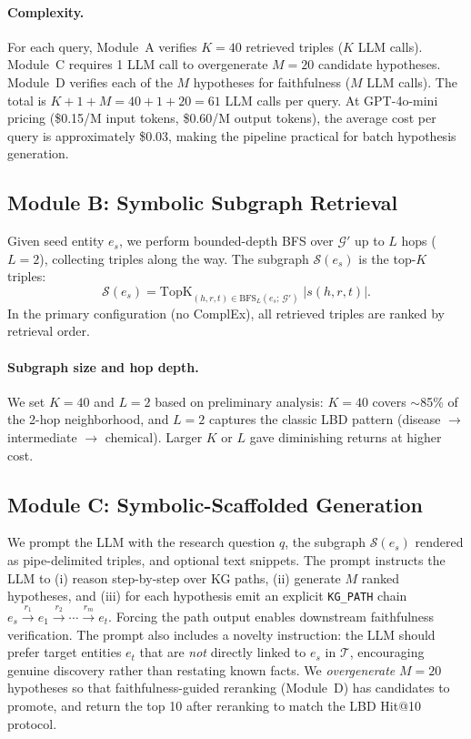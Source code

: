 \paragraph{Complexity.}
For each query, Module~A verifies $K{=}40$ retrieved triples ($K$ LLM calls). Module~C requires 1 LLM call to overgenerate $M{=}20$ candidate hypotheses. Module~D verifies each of the $M$ hypotheses for faithfulness ($M$ LLM calls). The total is $K{+}1{+}M = 40{+}1{+}20 = 61$ LLM calls per query. At GPT-4o-mini pricing (\$0.15/M input tokens, \$0.60/M output tokens), the average cost per query is approximately \$0.03, making the pipeline practical for batch hypothesis generation.

\subsection{Module B: Symbolic Subgraph Retrieval}
\label{sec:method:b}

Given seed entity $e_s$, we perform bounded-depth BFS over $\mathcal{G}'$ up to $L$ hops ($L{=}2$), collecting triples along the way. The subgraph $\mathcal{S}(e_s)$ is the top-$K$ triples:
\begin{equation}
  \mathcal{S}(e_s) = \mathrm{TopK}_{(h,r,t)\in\mathrm{BFS}_L(e_s;\,\mathcal{G}')}\; |s(h,r,t)|.
\end{equation}
In the primary configuration (no ComplEx), all retrieved triples are ranked by retrieval order.

\paragraph{Subgraph size and hop depth.}
We set $K{=}40$ and $L{=}2$ based on preliminary analysis: $K{=}40$ covers $\sim$85\% of the 2-hop neighborhood, and $L{=}2$ captures the classic LBD pattern (disease $\to$ intermediate $\to$ chemical). Larger $K$ or $L$ gave diminishing returns at higher cost.

\subsection{Module C: Symbolic-Scaffolded Generation}
\label{sec:method:c}

We prompt the LLM with the research question $q$, the subgraph $\mathcal{S}(e_s)$ rendered as pipe-delimited triples, and optional text snippets. The prompt instructs the LLM to (i) reason step-by-step over KG paths, (ii) generate $M$ ranked hypotheses, and (iii) for each hypothesis emit an explicit \texttt{KG\_PATH} chain $e_s\!\xrightarrow{r_1}\!e_1\!\xrightarrow{r_2}\!\cdots\!\xrightarrow{r_m}\!e_t$. Forcing the path output enables downstream faithfulness verification. The prompt also includes a novelty instruction: the LLM should prefer target entities $e_t$ that are \emph{not} directly linked to $e_s$ in $\mathcal{T}$, encouraging genuine discovery rather than restating known facts. We \emph{overgenerate} $M{=}20$ hypotheses so that faithfulness-guided reranking (Module~D) has candidates to promote, and return the top 10 after reranking to match the LBD Hit@10 protocol.

